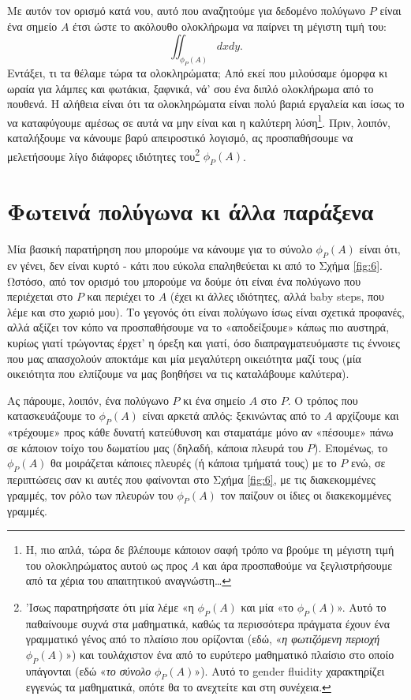 \documentclass[11pt,a4paper]{article}
\theoremstyle{definition}
\begin{document}
	Με αυτόν τον ορισμό κατά νου, αυτό που αναζητούμε για δεδομένο πολύγωνο $P$ είναι ένα σημείο $A$ έτσι ώστε το ακόλουθο ολοκλήρωμα να παίρνει τη μέγιστη τιμή του:
	\begin{equation}\label{eq:max_int}
	\iint_{\phi_P(A)}dxdy.
	\end{equation}
	Εντάξει, τι τα θέλαμε τώρα τα ολοκληρώματα; Από εκεί που μιλούσαμε όμορφα κι ωραία για λάμπες και φωτάκια, ξαφνικά, νά' σου ένα διπλό ολοκλήρωμα από το πουθενά. Η αλήθεια είναι ότι τα ολοκληρώματα είναι πολύ βαριά εργαλεία και ίσως το να καταφύγουμε αμέσως σε αυτά να μην είναι και η καλύτερη λύση\footnote{Η, πιο απλά, τώρα δε βλέπουμε κάποιον σαφή τρόπο να βρούμε τη μέγιστη τιμή του ολοκληρώματος αυτού ως προς $A$ και άρα προσπαθούμε να ξεγλιστρήσουμε από τα χέρια του απαιτητικού αναγνώστη\ldots}. Πριν, λοιπόν, καταλήξουμε να κάνουμε βαρύ απειροστικό λογισμό, ας προσπαθήσουμε να μελετήσουμε λίγο διάφορες ιδιότητες του\footnote{'Ισως παρατηρήσατε ότι μία λέμε «η $\phi_P(A)$ και μία «το $\phi_P(A)$». Αυτό το παθαίνουμε συχνά στα μαθηματικά, καθώς τα περισσότερα πράγματα έχουν ένα γραμματικό γένος από το πλαίσιο που ορίζονται (εδώ, «\textit{η φωτιζόμενη περιοχή} $\phi_P(A)$»{)} και τουλάχιστον ένα από το ευρύτερο μαθηματικό πλαίσιο στο οποίο υπάγονται (εδώ «\textit{το σύνολο} $\phi_P(A)$»{)}. Αυτό το gender fluidity χαρακτηρίζει εγγενώς τα μαθηματικά, οπότε θα το ανεχτείτε και στη συνέχεια.} $\phi_P(A)$.
	
	\section{Φωτεινά πολύγωνα κι άλλα παράξενα}
	Μία βασική παρατήρηση που μπορούμε να κάνουμε για το σύνολο $\phi_P(A)$ είναι ότι, εν γένει, δεν είναι κυρτό - κάτι που εύκολα επαληθεύεται κι από το Σχήμα \ref{fig:6}. Ωστόσο, από τον ορισμό του μπορούμε να δούμε ότι είναι ένα πολύγωνο που περιέχεται στο $P$ και περιέχει το $A$ (έχει κι άλλες ιδιότητες, αλλά baby steps, που λέμε και στο χωριό μου). Το γεγονός ότι είναι πολύγωνο ίσως είναι σχετικά προφανές, αλλά αξίζει τον κόπο να προσπαθήσουμε να το «αποδείξουμε» κάπως πιο αυστηρά, κυρίως γιατί τρώγοντας έρχετ' η όρεξη και γιατί, όσο διαπραγματευόμαστε τις έννοιες που μας απασχολούν αποκτάμε και μία μεγαλύτερη οικειότητα μαζί τους (μία οικειότητα που ελπίζουμε να μας βοηθήσει να τις καταλάβουμε καλύτερα).
	
	Ας πάρουμε, λοιπόν, ένα πολύγωνο $P$ κι ένα σημείο $A$ στο $P$. Ο τρόπος που κατασκευάζουμε το $\phi_P(A)$ είναι αρκετά απλός: ξεκινώντας από το $A$ αρχίζουμε και «τρέχουμε» προς κάθε δυνατή κατεύθυνση και σταματάμε μόνο αν «πέσουμε» πάνω σε κάποιον τοίχο του δωματίου μας (δηλαδή, κάποια πλευρά του $P$). Επομένως, το $\phi_P(A)$ θα μοιράζεται κάποιες πλευρές (ή κάποια τμήματά τους) με το $P$ ενώ, σε περιπτώσεις σαν κι αυτές που φαίνονται στο Σχήμα \ref{fig:6}, με τις διακεκομμένες γραμμές, τον ρόλο των πλευρών του $\phi_P(A)$ τον παίζουν οι ίδιες οι διακεκομμένες γραμμές.
	
\end{document}
